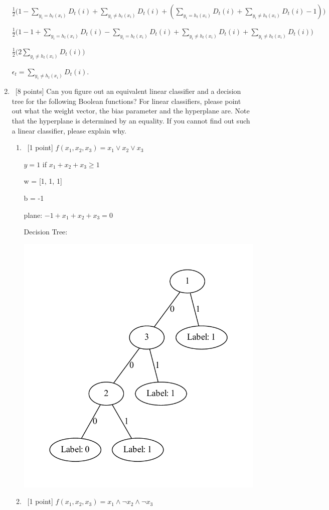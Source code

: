 \documentclass[12pt, fullpage,letterpaper]{article}
\begin{document}
\begin{enumerate}
$\frac{1}{2}\big(1 - \sum_{y_i = h_t(x_i)} D_t(i) + \sum_{y_i \neq h_t(x_i)} D_t(i) + (\sum_{y_i = h_t(x_i)} D_t(i) + \sum_{y_i \neq h_t(x_i)} D_t(i) - 1)\big)$

$\frac{1}{2}\big(1 - 1 + \sum_{y_i = h_t(x_i)}D_t(i) - \sum_{y_i = h_t(x_i)}D_t(i) + \sum_{y_i \neq h_t(x_i)}D_t(i) + \sum_{y_i \neq h_t(x_i)}D_t(i)\big)$

$\frac{1}{2}\big(2\sum_{y_i \neq h_t(x_i)}D_t(i)\big)$

$\epsilon_t = \sum_{y_i \neq h_t(x_i)} D_t(i).$

\bigskip

	\item~[8 points] Can you figure out an equivalent linear classifier and a decision tree for the following Boolean functions? For linear classifiers, please point out what the weight vector, the bias parameter and the hyperplane are. Note that the hyperplane is determined by an equality. If you cannot find out such a  linear classifier, please explain why. 
	\begin{enumerate}
		\item~[1 point] $f(x_1, x_2, x_3) = x_1 \lor x_2 \lor x_3$
		
		\bigskip
		$y = 1$ if $x_1 + x_2 + x_3 \ge 1$
		
		w = [1, 1, 1]
		
		b = -1
		
		plane: $-1 + x_1 + x_2 + x_3 = 0$
		
		Decision Tree:
		
		\includegraphics[scale=.5]{4a_tree.pdf}
		\bigskip\bigskip
		\item~[1 point] $f(x_1, x_2, x_3) = x_1 \land \neg x_2 \land \neg x_3$
		

\end{enumerate}
\end{enumerate}
\end{document}
